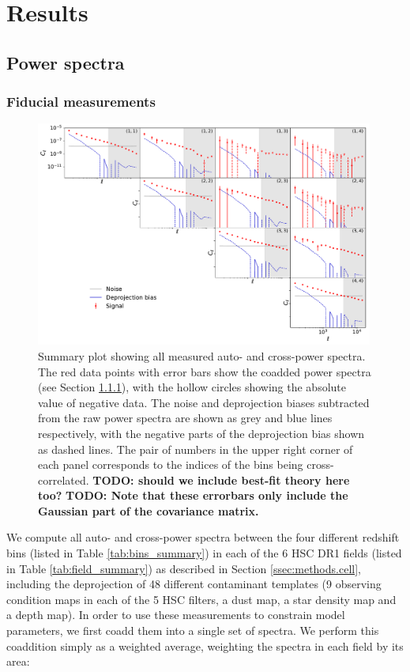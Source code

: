 \documentclass[a4paper,11pt]{article}
\newcommand{\todo}[1]{{\bf TODO: #1}}
\begin{document}
\section{Results}\label{sec:results}
  \subsection{Power spectra}\label{ssec:results.spectra}
    \subsubsection{Fiducial measurements}\label{sssec:results.spectra.fid}
      \begin{figure}
        \centering
        \includegraphics[width=0.99\textwidth]{figures/cls_summary.pdf}
        \caption{Summary plot showing all measured auto- and cross-power spectra. The red data points with error bars show the coadded power spectra (see Section \ref{sssec:results.spectra.fid}), with the hollow circles showing the absolute value of negative data. The noise and deprojection biases subtracted from the raw power spectra are shown as grey and blue lines respectively, with the negative parts of the deprojection bias shown as dashed lines. The pair of numbers in the upper right corner of each panel corresponds to the indices of the bins being cross-correlated. \todo{should we include best-fit theory here too?} \todo{Note that these errorbars only include the Gaussian part of the covariance matrix.}}
        \label{fig:cls_summary}
      \end{figure}
      We compute all auto- and cross-power spectra between the four different redshift bins (listed in Table \ref{tab:bins_summary}) in each of the 6 HSC DR1 fields (listed in Table \ref{tab:field_summary}) as described in Section \ref{ssec:methods.cell}, including the deprojection of 48 different contaminant templates (9 observing condition maps in each of the 5 HSC filters, a dust map, a star density map and a depth map). In order to use these measurements to constrain model parameters, we first coadd them into a single set of spectra. We perform this coaddition simply as a weighted average, weighting the spectra in each field by its area:
\end{document}
